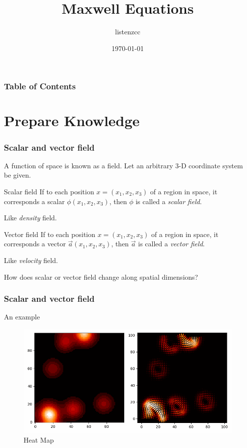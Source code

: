 \documentclass{beamer}
\title{Maxwell Equations}
\author{listenzcc}
\institute[VFU] %
{
  \inst{1}%
  Faculty of Physics\\
  Very Famous University
  \and
  \inst{2}%
  Faculty of Chemistry\\
  Very Famous University
}
\date{\today}
\begin{document}
\frame{\titlepage}

\begin{frame}
    \frametitle{Table of Contents}
    \tableofcontents
\end{frame}


\section{Prepare Knowledge}

\begin{frame}
    \frametitle{Scalar and vector field}
    A function of space is known as a field.
    Let an arbitrary 3-D coordinate system be given.

    \begin{block}{Scalar field}
        If to each position $x = (x_{1}, x_{2}, x_{3})$ of a region in space, it corresponds a scalar $\phi (x_{1}, x_{2}, x_{3})$, then $\phi$ is called a \emph{scalar field}.

        Like \emph{density} field.
    \end{block}

    \begin{block}{Vector field}
        If to each position $x = (x_{1}, x_{2}, x_{3})$ of a region in space, it corresponds a vector $\vec{a} (x_{1}, x_{2}, x_{3})$, then $\vec{a}$ is called a \emph{vector field}.

        Like \emph{velocity} field.
    \end{block}

    \pause
    How does scalar or vector field change along spatial dimensions?
\end{frame}

\begin{frame}
    \frametitle{Scalar and vector field}
    An example
    \begin{figure}[H]
        \centering
        \includegraphics[height=0.5\textheight]{heatmap.png}
        \caption{Heat Map}
        \label{fig: Heat map}
    \end{figure}
\end{frame}
\end{document}
